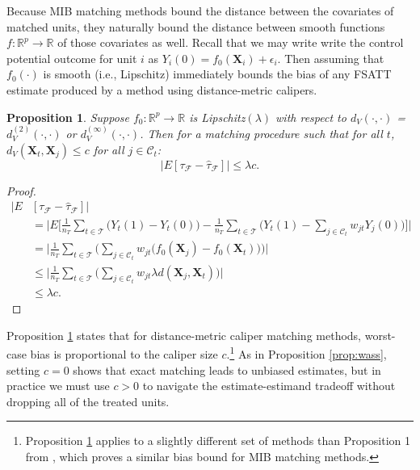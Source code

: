 \documentclass{article}
\newtheorem{proposition}[theorem]{Proposition}
\newcommand{\bX}{\mathbf{X}}
\newcommand{\Xt}{\mathbf{X}_t}
\newcommand{\Xj}{\mathbf{X}_j}
\newcommand{\Ct}{\mathcal{C}_{t}}
\begin{document}
Because MIB matching methods bound the distance between the covariates of matched units, they naturally bound the distance between smooth functions $f:\mathbb{R}^p \to \mathbb{R}$ of those covariates as well.
Recall that we may write write the control potential outcome for unit $i$ as $Y_i(0) = f_0(\bX_i) + \epsilon_i$.
Then assuming that $f_0(\cdot)$ is smooth (i.e., Lipschitz) immediately bounds the bias of any FSATT estimate produced by a method using distance-metric calipers.
\begin{proposition}
\label{prop:biasbd_lip}
Suppose $f_0: \mathbb{R}^p \to \mathbb{R}$ is Lipschitz$(\lambda)$ with respect to $d_V(\cdot, \cdot)$ = $d^{(2)}_V(\cdot, \cdot)$ or $d^{(\infty)}_V(\cdot, \cdot)$.
Then for a matching procedure such that for all $t$, $d_V(\Xt, \Xj) \leq c$ for all $j \in \Ct$:
\begin{equation*}
    \big|E[\tau_\mathcal{F} - \hat{\tau}_\mathcal{F}] \big| \leq \lambda c.
\end{equation*}
\end{proposition}
\begin{proof}
    \begin{align*}
        \big| E &[\tau_\mathcal{F} - \hat{\tau}_\mathcal{F} ] \big| \\
        &= \bigg| E\Big[\frac{1}{n_T}\sum_{t \in \mathcal{T}} \big( Y_t(1) - Y_t(0) \big) - \frac{1}{n_T}\sum_{t \in \mathcal{T}} \big( Y_t(1) - \sum_{j \in \Ct} w_{jt} Y_j(0) \big) \Big] \bigg| \\
        &= \bigg| \frac{1}{n_T} \sum_{t \in \mathcal{T}} 
            \Big( \sum_{j \in \Ct} w_{jt} \big(f_0(\Xj) - f_0(\Xt)\big) \Big) \bigg| \\
        &\leq \bigg| \frac{1}{n_T} \sum_{t \in \mathcal{T}} 
            \Big( \sum_{j \in \Ct} w_{jt} \lambda d(\Xj, \Xt) \Big) \bigg| \\
        &\leq \lambda c.
    \end{align*}
\end{proof}

Proposition \ref{prop:biasbd_lip} states that for distance-metric caliper matching methods, worst-case bias is proportional to the caliper size $c$.\footnote{Proposition \ref{prop:biasbd_lip} applies to a slightly different set of methods than Proposition 1 from \citet{iacus2011multivariate}, which proves a similar bias bound for MIB matching methods.}
As in Proposition \ref{prop:wass}, setting $c=0$ shows that exact matching leads to unbiased estimates, but in practice we must use $c > 0$ to navigate the estimate-estimand tradeoff without dropping all of the treated units.
\end{document}
